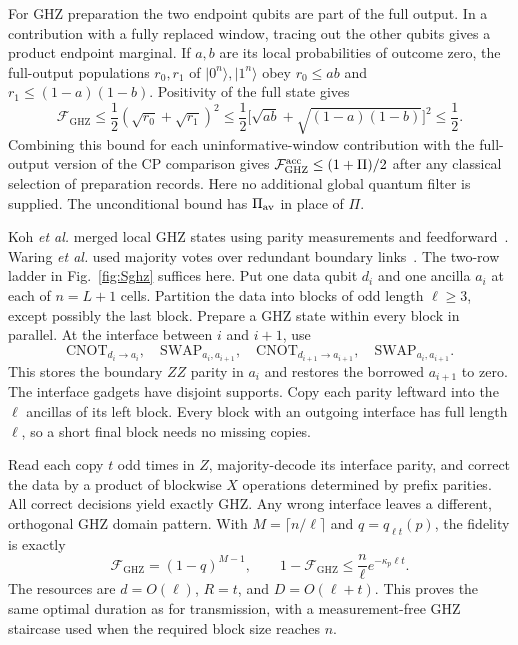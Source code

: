 \documentclass[aps,prl,twocolumn,superscriptaddress,longbibliography,reprint,floatfix]{revtex4-2}
\newcommand{\ket}[1]{\lvert #1\rangle}
\newcommand{\GHZ}{\mathrm{GHZ}}
\begin{document}
For GHZ preparation the two endpoint qubits are part of the full output.
In a contribution with a fully replaced window, tracing out the other
qubits gives a product endpoint marginal. If $a,b$ are its local
probabilities of outcome zero, the full-output populations $r_0,r_1$
of $\ket{0^n},\ket{1^n}$ obey $r_0\le ab$ and $r_1\le(1-a)(1-b)$.
Positivity of the full state gives
\begin{equation}
 \mathcal F_{\GHZ}\le\frac12(\sqrt{r_0}+\sqrt{r_1})^2
 \le\frac12\bigl[\sqrt{ab}+\sqrt{(1-a)(1-b)}\bigr]^2
 \le\frac12 .
\end{equation}
Combining this bound for each uninformative-window contribution with the full-output version of the CP comparison gives
$\mathcal F_{\GHZ}^{\rm acc}\le(1+\Pi)/2$ after any classical selection of preparation records. Here no additional global quantum filter is supplied. The unconditional bound has $\Pi_{\rm av}$ in place of $\Pi$.

Koh \emph{et al.} merged local GHZ states using parity measurements and
feedforward~\cite{Koh2026}. Waring \emph{et al.} used majority votes
over redundant boundary links~\cite{Waring2026}. The two-row ladder in
Fig.~\ref{fig:Sghz} suffices here. Put one data qubit $d_i$ and one ancilla $a_i$ at each of $n=L+1$ cells. Partition the data into blocks of odd length $\ell\ge3$, except possibly the last block. Prepare a GHZ state within every block in parallel. At the interface between $i$ and $i+1$, use
\begin{equation}
 \mathrm{CNOT}_{d_i\to a_i},\quad
 \mathrm{SWAP}_{a_i,a_{i+1}},\quad
 \mathrm{CNOT}_{d_{i+1}\to a_{i+1}},\quad
 \mathrm{SWAP}_{a_i,a_{i+1}}.
 \label{eq:Sghz-gadget}
\end{equation}
This stores the boundary $ZZ$ parity in $a_i$ and restores the borrowed $a_{i+1}$ to zero. The interface gadgets have disjoint supports. Copy each parity leftward into the $\ell$ ancillas of its left block. Every block with an outgoing interface has full length $\ell$, so a short final block needs no missing copies.

Read each copy $t$ odd times in $Z$, majority-decode its interface parity, and correct the data by a product of blockwise $X$ operations determined by prefix parities. All correct decisions yield exactly GHZ. Any wrong interface leaves a different, orthogonal GHZ domain pattern. With $M=\lceil n/\ell\rceil$ and $q=q_{\ell t}(p)$, the fidelity is exactly
\begin{equation}
 \mathcal F_{\GHZ}=(1-q)^{M-1},\qquad
 1-\mathcal F_{\GHZ}\le\frac n\ell e^{-\kappa_p\ell t}.
 \label{eq:Sghz-error}
\end{equation}
The resources are $d=O(\ell)$, $R=t$, and $D=O(\ell+t)$. This proves the same optimal duration as for transmission, with a measurement-free GHZ staircase used when the required block size reaches $n$.
\end{document}
